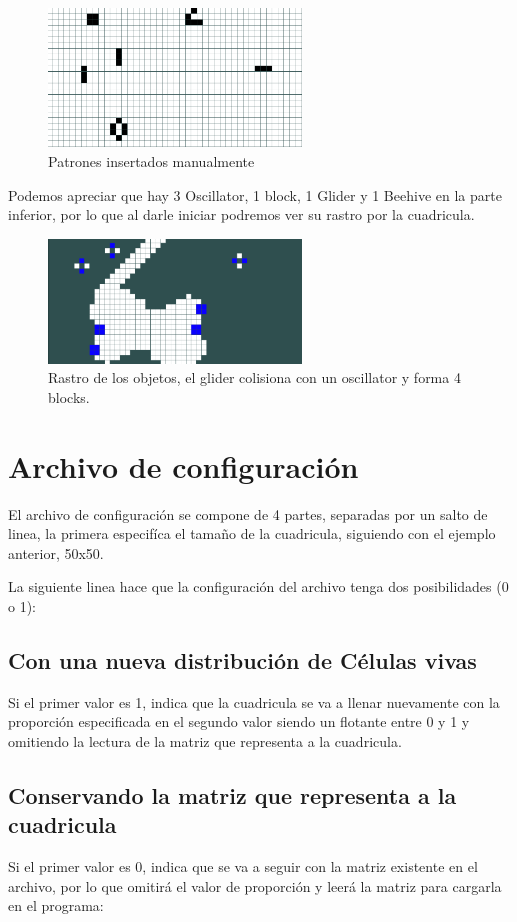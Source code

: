 \begin{figure}[h]
	\centering
	\includegraphics[width=0.6\textwidth]{capitulo2/images/03_plot.png}
	\caption{Patrones insertados manualmente}
	\label{fig:03_plot}
\end{figure}
Podemos apreciar que hay 3 Oscillator, 1 block,  1 Glider y 1 Beehive en la parte inferior, por lo que al darle iniciar podremos ver su rastro por la cuadricula.
\begin{figure}[h]
	\centering
	\includegraphics[width=0.6\textwidth]{capitulo2/images/04_plot.png}
	\caption{Rastro de los objetos, el glider colisiona con un oscillator y forma 4 blocks.}
	\label{fig:04_plot}
\end{figure}
\section{Archivo de configuración}
El archivo de configuración se compone de 4 partes, separadas por un salto de linea, la primera especifíca el tamaño de la cuadricula, siguiendo con el ejemplo anterior, 50x50.

La siguiente linea hace que la configuración del archivo tenga dos posibilidades (0 o 1):

\subsection{Con una nueva distribución de Células vivas}
Si el primer valor es 1, indica que la cuadricula se va a llenar nuevamente con la proporción especificada en el segundo valor siendo un flotante entre 0 y 1 y omitiendo la lectura de la matriz que representa a la cuadricula.
\subsection{Conservando la matriz que representa a la cuadricula}
Si el primer valor es 0, indica que se va a seguir con la matriz existente en el archivo, por lo que omitirá el valor de proporción y leerá la matriz para cargarla en el programa:


